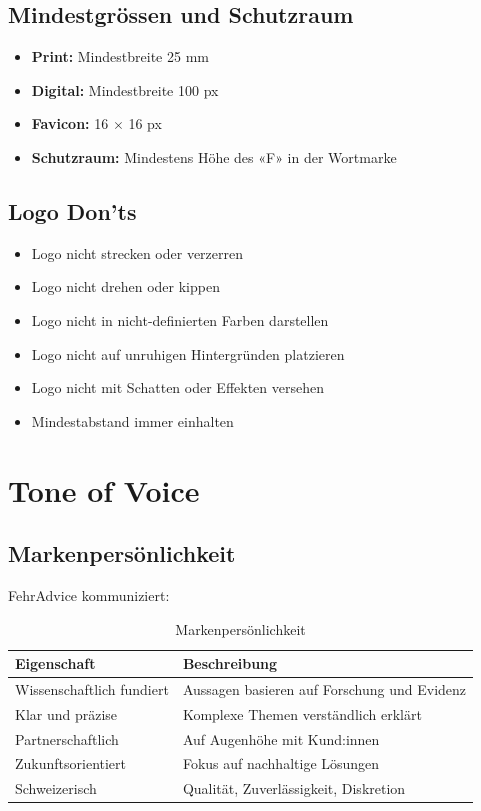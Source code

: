 \subsection{Mindestgrössen und Schutzraum}

\begin{itemize}
    \item \textbf{Print:} Mindestbreite 25 mm
    \item \textbf{Digital:} Mindestbreite 100 px
    \item \textbf{Favicon:} 16 $\times$ 16 px
    \item \textbf{Schutzraum:} Mindestens Höhe des «F» in der Wortmarke
\end{itemize}

\subsection{Logo Don'ts}

\begin{itemize}
    \item Logo nicht strecken oder verzerren
    \item Logo nicht drehen oder kippen
    \item Logo nicht in nicht-definierten Farben darstellen
    \item Logo nicht auf unruhigen Hintergründen platzieren
    \item Logo nicht mit Schatten oder Effekten versehen
    \item Mindestabstand immer einhalten
\end{itemize}


\section{Tone of Voice}
\label{sec:sg-tone}

\subsection{Markenpersönlichkeit}

FehrAdvice kommuniziert:

\begin{table}[h]
\centering
\caption{Markenpersönlichkeit}
\label{tab:brand-personality}
\begin{tabular}{ll}
\toprule
\textbf{Eigenschaft} & \textbf{Beschreibung} \\
\midrule
Wissenschaftlich fundiert & Aussagen basieren auf Forschung und Evidenz \\
Klar und präzise & Komplexe Themen verständlich erklärt \\
Partnerschaftlich & Auf Augenhöhe mit Kund:innen \\
Zukunftsorientiert & Fokus auf nachhaltige Lösungen \\
Schweizerisch & Qualität, Zuverlässigkeit, Diskretion \\
\bottomrule
\end{tabular}
\end{table}

